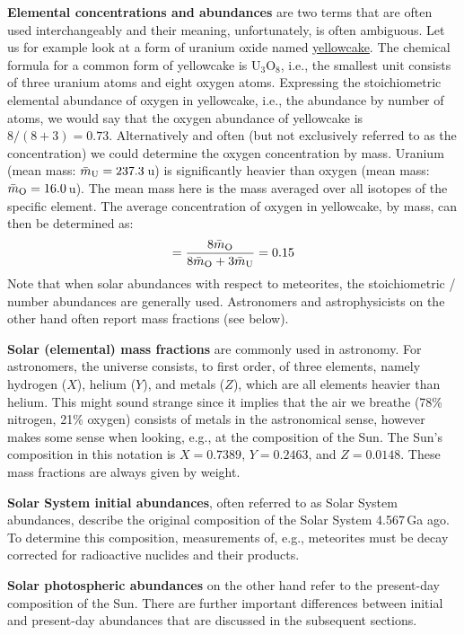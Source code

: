 \textbf{Elemental concentrations and abundances} are two terms that are often used interchangeably and their meaning, unfortunately, is often ambiguous. Let us for example look at a form of uranium oxide named \href{https://en.wikipedia.org/wiki/Yellowcake}{yellowcake}. The chemical formula for a common form of yellowcake is U$_3$O$_8$, i.e., the smallest unit consists of three uranium atoms and eight oxygen atoms. Expressing the stoichiometric elemental abundance of oxygen in yellowcake, i.e., the abundance by number of atoms, we would say that the oxygen abundance of yellowcake is $8 / (8+3) = 0.73$. Alternatively and often (but not exclusively referred to as the concentration) we could determine the oxygen concentration by mass. Uranium (mean mass: $\bar{m}_{\textnormal{U}} = 237.3$\,u) is significantly heavier than oxygen (mean mass: $\bar{m}_{\textnormal{O}} = 16.0$\,u). The mean mass here is the mass averaged over all isotopes of the specific element. The average concentration of oxygen in yellowcake, by mass, can then be determined as:
\begin{equation}
    [{\tn{O}}] = \frac{8 \bar{m}_{\tn{O}}}{8 \bar{m}_{\tn{O}} + 3 \bar{m}_{\tn{U}}} = 0.15
\end{equation}
Note that when solar abundances with respect to meteorites, the stoichiometric / number abundances are generally used. Astronomers and astrophysicists on the other hand often report mass fractions (see below).

\textbf{Solar (elemental) mass fractions} are commonly used in astronomy. For astronomers, the universe consists, to first order, of three elements, namely hydrogen ($X$), helium ($Y$), and metals ($Z$), which are all elements heavier than helium. This might sound strange since it implies that the air we breathe (78\% nitrogen, 21\% oxygen) consists of metals in the astronomical sense, however makes some sense when looking, e.g., at the composition of the Sun. The Sun's composition in this notation is $X=0.7389$, $Y=0.2463$, and $Z=0.0148$. These mass fractions are always given by weight.

\textbf{Solar System initial abundances}, often referred to as Solar System abundances, describe the original composition of the Solar System 4.567\,Ga ago. To determine this composition, measurements of, e.g., meteorites must be decay corrected for radioactive nuclides and their products.

\textbf{Solar photospheric abundances} on the other hand refer to the present-day composition of the Sun. There are further important differences between initial and present-day abundances that are discussed in the subsequent sections.

